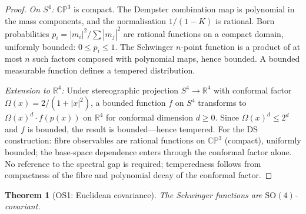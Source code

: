 \documentclass[11pt,a4paper]{article}
\newtheorem{theorem}{Theorem}[section]
\theoremstyle{definition}
\theoremstyle{remark}
\newcommand{\CP}{\mathbb{CP}}
\newcommand{\R}{\mathbb{R}}
\begin{document}
\begin{proof}
\emph{On $S^4$:} $\CP^3$ is compact. The Dempster combination map is polynomial in the mass components, and the normalisation $1/(1-K)$ is rational. Born probabilities $p_i=|m_i|^2/\sum|m_j|^2$ are rational functions on a compact domain, uniformly bounded: $0\leq p_i\leq 1$. The Schwinger $n$-point function is a product of at most $n$ such factors composed with polynomial maps, hence bounded. A bounded measurable function defines a tempered distribution.

\emph{Extension to $\R^4$:} Under stereographic projection $S^4\to\R^4$ with conformal factor $\Omega(x)=2/(1+|x|^2)$, a bounded function $f$ on $S^4$ transforms to $\Omega(x)^d\cdot f(p(x))$ on $\R^4$ for conformal dimension $d\geq 0$. Since $\Omega(x)^d\leq 2^d$ and $f$ is bounded, the result is bounded---hence tempered. For the DS construction: fibre observables are rational functions on $\CP^3$ (compact), uniformly bounded; the base-space dependence enters through the conformal factor alone. No reference to the spectral gap is required; temperedness follows from compactness of the fibre and polynomial decay of the conformal factor.
\end{proof}

\begin{theorem}[OS1: Euclidean covariance]\label{thm:OS1}
The Schwinger functions are $\mathrm{SO}(4)$-covariant.
\end{theorem}
\end{document}
